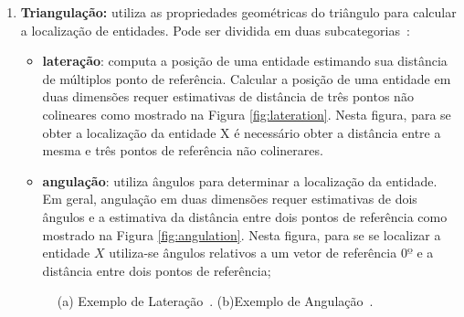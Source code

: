 	\begin{enumerate}
		\item \textbf{Triangulação:} utiliza as propriedades geométricas do triângulo
		para calcular a localização de entidades. Pode ser dividida em duas
		subcategorias~\cite{triangulacao}: 
			\begin{itemize}
				\item \textbf{lateração}: computa a posição de uma
		entidade estimando sua distância de múltiplos ponto de referência. Calcular a
		posição de uma entidade em duas dimensões requer estimativas de distância de
		três pontos não colineares como mostrado na Figura \ref{fig:lateration}. Nesta figura, para se obter a localização da entidade X é necessário obter a distância entre a mesma e três pontos de referência não colinerares.
				\item \textbf{angulação}: utiliza
		ângulos para determinar a localização da entidade. Em geral, angulação em duas
		dimensões requer estimativas de dois ângulos e a estimativa da distância entre
		dois pontos de referência como mostrado na Figura
		\ref{fig:angulation}. Nesta figura, para se se localizar a
			entidade $\displaystyle X$ utiliza-se ângulos relativos a um vetor de
			referência $\displaystyle 0º$ e a distância entre dois pontos de referência;
			\end{itemize}

		
		\begin{figure}[htb]
			\begin{center}
			\end{center}
			\caption{ (a) Exemplo de Lateração~\cite{triangulacao}. (b)Exemplo de Angulação~\cite{triangulacao}.}
		\end{figure}


\end{enumerate}
